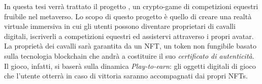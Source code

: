 
In questa tesi verrà trattato il progetto \nomeapp{}, un crypto-game di competizioni equestri fruibile nel metaverso.
%
Lo scopo di questo progetto è quello di creare una realtà virtuale immersiva in cui gli utenti possono diventare proprietari di cavalli digitali, iscriverli a competizioni equestri ed assistervi attraverso i propri avatar.
%
La proprietà dei cavalli sarà garantita da un NFT, un token non fungibile basato sulla tecnologia blockchain che andrà a costituire il suo \textit{certificato di autenticità}.
%
Il gioco, infatti, si baserà sulla dinamica \textit{Play-to-earn}: gli oggetti digitali di gioco che l'utente otterrà in caso di vittoria saranno accompagnati dai propri NFTs.


